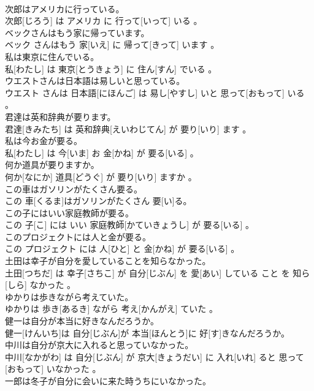 \documentclass[8pt]{extreport}
\begin{document}
\begin{CJK}{UTF8}{min}
\\	次郎はアメリカに行っている。	
\\	次郎[じろう] は アメリカ に 行って[いって] いる 。
\\	ベックさんはもう家に帰っています。	
\\	ベック さんはもう 家[いえ] に 帰って[きって] います 。
\\	私は東京に住んでいる。	
\\	私[わたし] は 東京[とうきょう] に 住ん[すん] でいる 。
\\	ウエストさんは日本語は易しいと思っている。	
\\	ウエスト さんは 日本語[にほんご] は 易し[やすし] いと 思って[おもって] いる 。
\\	君達は英和辞典が要ります。	
\\	君達[きみたち] は 英和辞典[えいわじてん] が 要り[いり] ます 。
\\	私は今お金が要る。	
\\	私[わたし] は 今[いま] お 金[かね] が 要る[いる] 。
\\	何か道具が要りますか。	
\\	何か[なにか] 道具[どうぐ] が 要り[いり] ますか 。
\\	この車はガソリンがたくさん要る。	
\\	この 車[くるま]はガソリンがたくさん 要[い]る。
\\	この子にはいい家庭教師が要る。	
\\	この 子[こ] には いい 家庭教師[かていきょうし] が 要る[いる] 。
\\	このプロジェクトには人と金が要る。	
\\	この プロジェクト には 人[ひと] と 金[かね] が 要る[いる] 。
\\	土田は幸子が自分を愛していることを知らなかった。	
\\	土田[つちだ] は 幸子[さちこ] が 自分[じぶん] を 愛[あい] している こと を 知ら[しら] なかった 。
\\	ゆかりは歩きながら考えていた。	
\\	ゆかりは 歩き[あるき] ながら 考え[かんがえ] ていた 。
\\	健一は自分が本当に好きなんだろうか。	
\\	健一[けんいち]は 自分[じぶん]が 本当[ほんとう]に 好[す]きなんだろうか。
\\	中川は自分が京大に入れると思っていなかった。	
\\	中川[なかがわ] は 自分[じぶん] が 京大[きょうだい] に 入れ[いれ] ると 思って[おもって] いなかった 。
\\	一郎は冬子が自分に会いに来た時うちにいなかった。	

\end{CJK}
\end{document}
